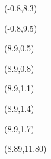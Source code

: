 \begin{titlepage}
	\color{white}
	\sffamily\small
	
	\begin{textblock}{10}(-0.8,8.3)
		\parTa{\textbf{\docTitle}}
	\end{textblock}
	
	\begin{textblock}{10}(-0.8,9.5)
		\parTb{\docSubTitle}
	\end{textblock}
	
	\newcommand{\creatorX}{8.9}
	
	\begin{textblock}{10}(\creatorX,0.5)
	\end{textblock}
	
	\begin{textblock}{10}(\creatorX,0.8)
		\parTc{\docCreaterA}
	\end{textblock}
	
	\begin{textblock}{10}(\creatorX,1.1)
		\parTc{\docCreaterB}
	\end{textblock}
	
	\begin{textblock}{10}(\creatorX,1.4)
		\parTc{\docCreaterC}
	\end{textblock}
	
	\begin{textblock}{10}(\creatorX,1.7)
		\parTc{\docCreatorMail}
	\end{textblock}
	
	\begin{textblock}{10}(8.89,11.80)
		\parTc{\textbf{\docLocation , \docDate}}	
	\end{textblock}
	
	\clearpage
	
	
	\color{black}
	
	
	\end{titlepage}